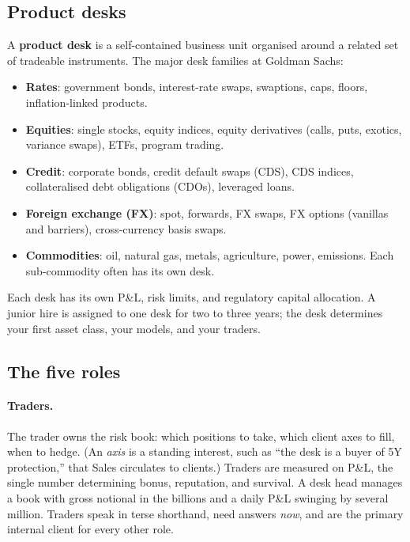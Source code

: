 \subsection{Product desks}

A \textbf{product desk} is a self-contained business unit organised
around a related set of tradeable instruments.  The major desk
families at Goldman Sachs:

\begin{itemize}
  \item \textbf{Rates}: government bonds, interest-rate swaps,
    swaptions, caps, floors, inflation-linked products.
  \item \textbf{Equities}: single stocks, equity indices, equity
    derivatives (calls, puts, exotics, variance swaps), ETFs, program
    trading.
  \item \textbf{Credit}: corporate bonds, credit default swaps
    (CDS), CDS indices, collateralised debt obligations (CDOs),
    leveraged loans.
  \item \textbf{Foreign exchange (FX)}: spot, forwards, FX swaps,
    FX options (vanillas and barriers), cross-currency basis swaps.
  \item \textbf{Commodities}: oil, natural gas, metals,
    agriculture, power, emissions.  Each sub-commodity often has its
    own desk.
\end{itemize}

Each desk has its own P\&L, risk limits, and regulatory capital
allocation.  A junior hire is assigned to one desk for two to three
years; the desk determines your first asset class, your models, and
your traders.

\subsection{The five roles}

\paragraph{Traders.}
The trader owns the risk book: which positions to take, which
client axes to fill, when to hedge.  (An \emph{axis} is a standing
interest, such as ``the desk is a buyer of 5Y protection,'' that Sales
circulates to clients.)  Traders are measured on P\&L,
the single number determining bonus, reputation, and survival.  A
desk head manages a book with gross notional in the billions and a
daily P\&L swinging by several million.  Traders speak in terse
shorthand, need answers \emph{now}, and are the primary internal
client for every other role.

